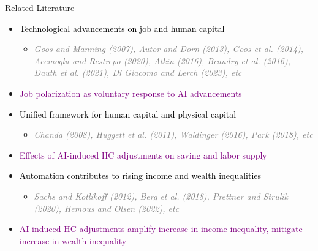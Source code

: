 \documentclass[serif, aspectratio=169]{beamer}
\theoremstyle{remark}
\theoremstyle{plain}
\begin{document}
\begin{frame}{Related Literature}

\begin{itemize}
\item \textcolor{black}{Technological advancements on job and human capital}
\begin{itemize}
\item \textit{\textcolor{gray}{Goos and Manning (2007), Autor and Dorn (2013),
Goos et al. (2014), Acemoglu and Restrepo (2020), Atkin (2016), Beaudry et al. (2016), Dauth
et al. (2021), Di Giacomo and Lerch (2023), etc}}
\end{itemize}
\item[] \textcolor{purple}{Job polarization as voluntary response to AI advancements}
\smallskip{}

\item \textcolor{black}{Unified framework for human capital and physical capital}
\begin{itemize}
\item \textit{\textcolor{gray}{Chanda (2008), Huggett et al. (2011), Waldinger (2016), Park (2018), etc}}
\end{itemize}
\item[] \textcolor{purple}{Effects of AI-induced HC adjustments on saving and labor supply}
\smallskip{}

\item \textcolor{black}{Automation contributes to rising income and wealth inequalities}
\begin{itemize}
\item \textit{\textcolor{gray}{Sachs and Kotlikoff (2012), Berg et al. (2018), Prettner and
Strulik (2020), Hemous and Olsen (2022), etc}}
\end{itemize}
\item[] \textcolor{purple}{AI-induced HC adjustments amplify increase in income inequality, mitigate increase in wealth inequality}
\end{itemize}

\end{frame}
\end{document}
